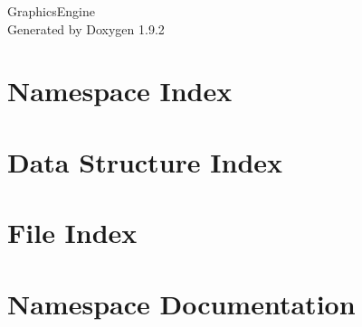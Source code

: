 \documentclass[twoside]{book}
\newcommand{\+}{\discretionary{\mbox{\scriptsize$\hookleftarrow$}}{}{}}
\newcommand{\clearemptydoublepage}{%
    \newpage{\pagestyle{empty}\cleardoublepage}%
  }
\begin{document}
  \raggedbottom
    \hypersetup{pageanchor=false,
                bookmarksnumbered=true,
                pdfencoding=unicode
               }
  \begin{titlepage}
  \vspace*{7cm}
  \begin{center}%
  {\Large Graphics\+Engine}\\
  \vspace*{1cm}
  {\large Generated by Doxygen 1.9.2}\\
  \end{center}
  \end{titlepage}
  \clearemptydoublepage
  \tableofcontents
  \clearemptydoublepage
  \hypersetup{pageanchor=true}
\chapter{Namespace Index}

\chapter{Data Structure Index}

\chapter{File Index}

\chapter{Namespace Documentation}




\end{document}
